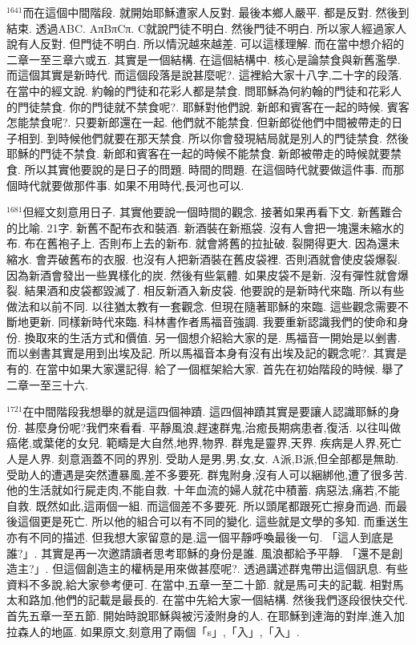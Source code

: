 \documentclass{book}
\begin{document}
$^{1641}$而在這個中間階段.
就開始耶穌遭家人反對.
最後本鄉人嚴平.
都是反對.
然後到結束.
透過ABC.
AπBπCπ.
C就說門徒不明白.
然後門徒不明白.
所以家人經過家人說有人反對.
但門徒不明白.
所以情況越來越差.
可以這樣理解.
而在當中想介紹的二章一至三章六或五.
其實是一個結構.
在這個結構中.
核心是論禁食與新舊濫學.
而這個其實是新時代.
而這個段落是說甚麼呢?.
這裡給大家十八字,二十字的段落.
在當中的經文說.
約翰的門徒和花彩人都是禁食.
問耶穌為何約翰的門徒和花彩人的門徒禁食.
你的門徒就不禁食呢?.
耶穌對他們說.
新郎和賓客在一起的時候.
賓客怎能禁食呢?.
只要新郎還在一起.
他們就不能禁食.
但新郎從他們中間被帶走的日子相到.
到時候他們就要在那天禁食.
所以你會發現結局就是別人的門徒禁食.
然後耶穌的門徒不禁食.
新郎和賓客在一起的時候不能禁食.
新郎被帶走的時候就要禁食.
所以其實他要說的是日子的問題.
時間的問題.
在這個時代就要做這件事.
而那個時代就要做那件事.
如果不用時代,長河也可以.

$^{1681}$但經文刻意用日子.
其實他要說一個時間的觀念.
接著如果再看下文.
新舊難合的比喻.
21字.
新舊不配布衣和裝酒.
新酒裝在新瓶袋.
沒有人會把一塊還未縮水的布.
布在舊袍子上.
否則布上去的新布.
就會將舊的拉扯破.
裂開得更大.
因為還未縮水.
會弄破舊布的衣服.
也沒有人把新酒裝在舊皮袋裡.
否則酒就會使皮袋爆裂.
因為新酒會發出一些異樣化的炭.
然後有些氣體.
如果皮袋不是新.
沒有彈性就會爆裂.
結果酒和皮袋都毀滅了.
相反新酒入新皮袋.
他要說的是新時代來臨.
所以有些做法和以前不同.
以往猶太教有一套觀念.
但現在隨著耶穌的來臨.
這些觀念需要不斷地更新.
同樣新時代來臨.
科林書作者馬福音強調.
我要重新認識我們的使命和身份.
換取來的生活方式和價值.
另一個想介紹給大家的是.
馬福音一開始是以剉書.
而以剉書其實是用到出埃及記.
所以馬福音本身有沒有出埃及記的觀念呢?.
其實是有的.
在當中如果大家還記得.
給了一個框架給大家.
首先在初始階段的時候.
舉了二章一至三十六.

$^{1721}$在中間階段我想舉的就是這四個神蹟.
這四個神蹟其實是要讓人認識耶穌的身份.
甚麼身份呢?我們來看看.
平靜風浪,趕速群鬼,治癒長期病患者,復活.
以往叫做癌佬,或葉佬的女兒.
範疇是大自然,地界,物界.
群鬼是靈界,天界.
疾病是人界,死亡人是人界.
刻意涵蓋不同的界別.
受助人是男,男,女,女.
A派,B派,但全部都是無助.
受助人的遭遇是突然遭暴風,差不多要死.
群鬼附身,沒有人可以綑綁他,遭了很多苦.
他的生活就如行屍走肉,不能自救.
十年血流的婦人就花中積蓄.
病惡法,痛若,不能自救.
既然如此,這兩個一組.
而這個差不多要死.
所以頭尾都跟死亡擦身而過.
而最後這個更是死亡.
所以他的組合可以有不同的變化.
這些就是文學的多知.
而重送生亦有不同的描述.
但我想大家留意的是,這一個平靜呼喚最後一句.
「這人到底是誰?」.
其實是再一次邀請讀者思考耶穌的身份是誰.
風浪都給予平靜.
「還不是創造主?」.
但這個創造主的權柄是用來做甚麼呢?.
透過講述群鬼帶出這個訊息.
有些資料不多說,給大家參考便可.
在當中,五章一至二十節.
就是馬可夫的記載.
相對馬太和路加,他們的記載是最長的.
在當中先給大家一個結構.
然後我們逐段很快交代.
首先五章一至五節.
開始時說耶穌與被污淩附身的人.
在耶穌到達海的對岸,進入加拉森人的地區.
如果原文,刻意用了兩個「s」,「入」,「入」.
\end{document}
